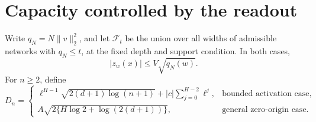\section{Capacity controlled by the readout}
Write $q_N=N\|v\|_2^2$, and let $\mathcal F_t$ be the union over all widths of admissible networks with $q_N\le t$, at the fixed depth and support condition. In both cases,
\begin{equation}
 |z_w(x)|\le V\sqrt{q_N(w)}.
 \label{eq:envelope}
\end{equation}
For $n\ge2$, define
\begin{equation}
 D_n=\begin{cases}
 \ell^{H-1}\sqrt{2(d+1)\log(n+1)}+|c|\sum_{j=0}^{H-2}\ell^j,&\text{bounded activation case},\\
 A\sqrt{2\{H\log2+\log(2(d+1))\}},&\text{general zero-origin case}.
 \end{cases}
 \label{eq:D}
\end{equation}

